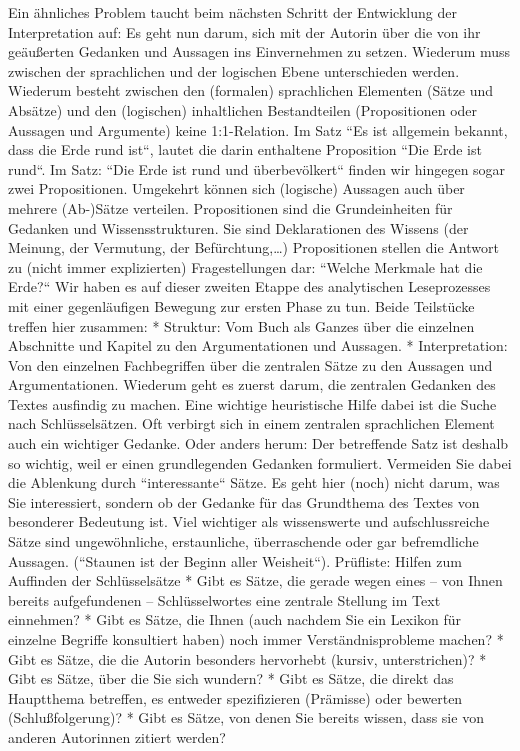 \documentclass[]{book}
\theoremstyle{definition}
\theoremstyle{definition}
\theoremstyle{definition}
\theoremstyle{remark}
\begin{document}
Ein ähnliches Problem taucht beim nächsten Schritt der Entwicklung der
Interpretation auf: Es geht nun darum, sich mit der Autorin über die von
ihr geäußerten Gedanken und Aussagen ins Einvernehmen zu setzen.
Wiederum muss zwischen der sprachlichen und der logischen Ebene
unterschieden werden. Wiederum besteht zwischen den (formalen)
sprachlichen Elementen (Sätze und Absätze) und den (logischen)
inhaltlichen Bestandteilen (Propositionen oder Aussagen und Argumente)
keine 1:1-Relation. Im Satz ``Es ist allgemein bekannt, dass die Erde
rund ist``, lautet die darin enthaltene Proposition ``Die Erde ist
rund``. Im Satz: ``Die Erde ist rund und überbevölkert`` finden wir
hingegen sogar zwei Propositionen. Umgekehrt können sich (logische)
Aussagen auch über mehrere (Ab-)Sätze verteilen. Propositionen sind die
Grundeinheiten für Gedanken und Wissensstrukturen. Sie sind
Deklarationen des Wissens (der Meinung, der Vermutung, der
Befürchtung,\ldots{}) Propositionen stellen die Antwort zu (nicht immer
explizierten) Fragestellungen dar: ``Welche Merkmale hat die Erde?`` Wir
haben es auf dieser zweiten Etappe des analytischen Leseprozesses mit
einer gegenläufigen Bewegung zur ersten Phase zu tun. Beide Teilstücke
treffen hier zusammen: * Struktur: Vom Buch als Ganzes über die
einzelnen Abschnitte und Kapitel zu den Argumentationen und Aussagen. *
Interpretation: Von den einzelnen Fachbegriffen über die zentralen Sätze
zu den Aussagen und Argumentationen. Wiederum geht es zuerst darum, die
zentralen Gedanken des Textes ausfindig zu machen. Eine wichtige
heuristische Hilfe dabei ist die Suche nach Schlüsselsätzen. Oft
verbirgt sich in einem zentralen sprachlichen Element auch ein wichtiger
Gedanke. Oder anders herum: Der betreffende Satz ist deshalb so wichtig,
weil er einen grundlegenden Gedanken formuliert. Vermeiden Sie dabei die
Ablenkung durch ``interessante`` Sätze. Es geht hier (noch) nicht darum,
was Sie interessiert, sondern ob der Gedanke für das Grundthema des
Textes von besonderer Bedeutung ist. Viel wichtiger als wissenswerte und
aufschlussreiche Sätze sind ungewöhnliche, erstaunliche, überraschende
oder gar befremdliche Aussagen. (``Staunen ist der Beginn aller
Weisheit``). Prüfliste: Hilfen zum Auffinden der Schlüsselsätze * Gibt
es Sätze, die gerade wegen eines -- von Ihnen bereits aufgefundenen --
Schlüsselwortes eine zentrale Stellung im Text einnehmen? * Gibt es
Sätze, die Ihnen (auch nachdem Sie ein Lexikon für einzelne Begriffe
konsultiert haben) noch immer Verständnisprobleme machen? * Gibt es
Sätze, die die Autorin besonders hervorhebt (kursiv, unterstrichen)? *
Gibt es Sätze, über die Sie sich wundern? * Gibt es Sätze, die direkt
das Hauptthema betreffen, es entweder spezifizieren (Prämisse) oder
bewerten (Schlußfolgerung)? * Gibt es Sätze, von denen Sie bereits
wissen, dass sie von anderen Autorinnen zitiert werden?
\end{document}
